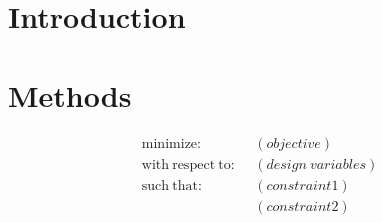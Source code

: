 \documentclass[journal]{new-aiaa} %
\begin{document}
\section{Introduction}
\label{sec:intro}











\section{Methods}
\label{sec:methods}


\begin{equation} %
\label{eqn:optimization_problem} %
	\begin{aligned}
		\mathrm{minimize:~~} & (objective) \\ %
		\mathrm{with~respect~to:~~} & (design~variables) \\ %
		\mathrm{such~that:~~} & (constraint1) \\ %
					   & (constraint2) \\ %
	\end{aligned}
\end{equation}
\end{document}
